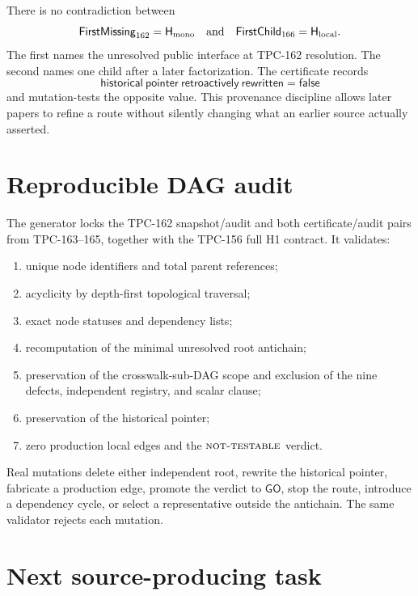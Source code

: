\documentclass[11pt]{article}
\theoremstyle{definition}
\theoremstyle{remark}
\newcommand{\NT}{\textnormal{\textsc{not-testable}}}
\newcommand{\Hmono}{\mathsf H_{\rm mono}}
\newcommand{\Hlocal}{\mathsf H_{\rm local}}
\begin{document}
There is no contradiction between
\[
 \mathsf{FirstMissing}_{162}=\Hmono
 \quad\text{and}\quad
 \mathsf{FirstChild}_{166}=\Hlocal.
\]
The first names the unresolved public interface at TPC-162
resolution.  The second names one child after a later factorization.
The certificate records
\[
 \mathsf{historical\ pointer\ retroactively\ rewritten}=\mathsf{false}
\]
and mutation-tests the opposite value.  This provenance discipline
allows later papers to refine a route without silently changing what
an earlier source actually asserted.

\section{Reproducible DAG audit}

The generator locks the TPC-162 snapshot/audit and both
certificate/audit pairs from TPC-163--165, together with the TPC-156
full H1 contract.  It validates:
\begin{enumerate}[leftmargin=2.1em]
 \item unique node identifiers and total parent references;
 \item acyclicity by depth-first topological traversal;
 \item exact node statuses and dependency lists;
 \item recomputation of the minimal unresolved root antichain;
 \item preservation of the crosswalk-sub-DAG scope and exclusion of
       the nine defects, independent registry, and scalar clause;
 \item preservation of the historical pointer;
 \item zero production local edges and the \(\NT\) verdict.
\end{enumerate}
Real mutations delete either independent root, rewrite the historical
pointer, fabricate a production edge, promote the verdict to
\(\mathsf{GO}\), stop the route, introduce a dependency cycle, or
select a representative outside the antichain.  The same validator
rejects each mutation.

\section{Next source-producing task}
\end{document}

